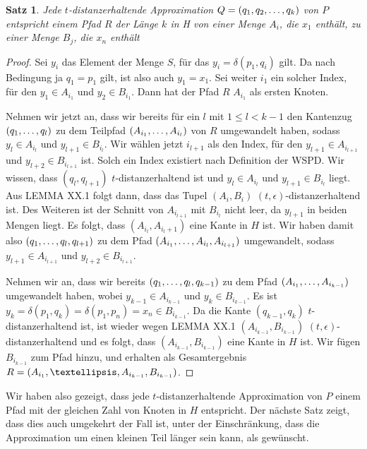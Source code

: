 \documentclass[11pt]{article}
\newtheorem{theorem}{Satz}[section]
\begin{document}
	\begin{theorem}
		\label{theo:Approx2H}
		Jede $t$-distanzerhaltende Approximation $Q = (q_1, q_2, \mathellipsis, q_k)$ von $P$ entspricht einem Pfad $R$ der Länge $k$ in H von einer Menge $A_i$, die $x_1$ enthält, zu einer Menge $B_j$, die $x_n$ enthält
	\end{theorem}
	\begin{proof}
		Sei $y_i$ das Element der Menge $S$, für das $y_i = \delta(p_1, q_i)$ gilt. Da nach Bedingung ja $q_1 = p_1$ gilt, ist also auch $y_1 = x_1$.
		Sei weiter $i_1$ ein solcher Index, für den $y_1 \in A_{i_1}$ und $y_2 \in B_{i_1}$. Dann hat der Pfad $R$ $A_{i_1}$ als ersten Knoten.
		
		Nehmen wir jetzt an, dass wir bereits für ein $l$ mit $1 \leq l < k-1$ den Kantenzug $(q_1, \mathellipsis, q_l)$ zu dem Teilpfad $(A_{i_1}, \mathellipsis, A_{i_l})$ von $R$ umgewandelt haben, sodass $y_l \in A_{i_l}$ und $y_{l+1} \in B_{i_l}$. Wir wählen jetzt $i_{l+1}$ als den Index, für den $y_{l+1} \in A_{i_{l+1}}$ und $y_{l+2} \in B_{i_{l+1}}$ ist. Solch ein Index existiert nach Definition der WSPD. Wir wissen, dass $(q_l, q_{l+1})$ $t$-distanzerhaltend ist und $y_l \in A_{i_l}$ und $y_{l+1} \in B_{i_l} $ liegt. Aus LEMMA XX.1 folgt dann, dass das Tupel $(A_i, B_i)$ $(t, \epsilon)$-distanzerhaltend ist. Des Weiteren ist der Schnitt von $A_{i_{l+1}}$ mit $B_{i_l}$ nicht leer, da $y_{l+1}$ in beiden Mengen liegt. Es folgt, dass $(A_{i_l}, A_{i_l+1})$ eine Kante in $H$ ist. Wir haben damit also $(q_1, \mathellipsis, q_l, q_{l+1})$ zu dem Pfad $(A_{i_1}, \mathellipsis, A_{i_l}, A_{i_{l+1}})$ umgewandelt, sodass $y_{l+1} \in A_{i_{l+1}}$ und $y_{l+2} \in B_{i_{l+1}}$.
		
		Nehmen wir an, dass wir bereits $(q_1, \mathellipsis, q_l, q_{k-1})$ zu dem Pfad $(A_{i_1}, \mathellipsis, A_{i_{k-1}})$ umgewandelt haben, wobei $y_{k-1} \in A_{i_{k-1}}$ und $y_k \in B_{i_{k-1}}$. Es ist $y_k = \delta(p_1, q_k) = \delta(p_1, p_n) = x_n \in B_{i_{k-1}}$. Da die Kante $(q_{k-1}, q_k)$ $t$-distanzerhaltend ist, ist wieder wegen LEMMA XX.1 $(A_{i_{k-1}}, B_{i_{k-1}})$ $(t, \epsilon)$-distanzerhaltend und es folgt, dass $(A_{i_{k-1}}, B_{i_{k-1}})$ eine Kante in $H$ ist. Wir fügen $B_{i_{k-1}}$ zum Pfad hinzu, und erhalten als Gesamtergebnis $R = (A_{i_1}, \textellipsis, A_{i_{k-1}}, B_{i_{k-1}})$.
	\end{proof}
	
	Wir haben also gezeigt, dass jede $t$-distanzerhaltende Approximation von $P$ einem Pfad mit der gleichen Zahl von Knoten in $H$ entspricht. Der nächste Satz zeigt, dass dies auch umgekehrt der Fall ist, unter der Einschränkung, dass die Approximation um einen kleinen Teil länger sein kann, als gewünscht.
	
\end{document}
